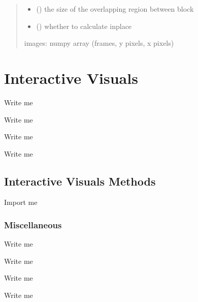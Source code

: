 \documentclass[letterpaper,10pt,english]{sphinxmanual}
\begin{document}
\begin{fulllineitems}
\begin{quote}
\begin{description}
\begin{itemize}
\item {} 
\sphinxAtStartPar
{} () \textendash{} the size of the overlapping region between block

\item {} 
\sphinxAtStartPar
{} () \textendash{} whether to calculate in\sphinxhyphen{}place

\end{itemize}

\sphinxAtStartPar
images: numpy array (frames, y pixels, x pixels)

\sphinxAtStartPar
{}

\end{description}\end{quote}

\end{fulllineitems}



\section{Interactive Visuals}
\label{\detokenize{Sub-Packages:interactive-visuals}}\label{\detokenize{Sub-Packages:interactive-visuals-module}}
\begin{DUlineblock}{0em}
\item[] Write me
\item[] Write me
\item[] Write me
\item[] Write me
\end{DUlineblock}


\subsection{Interactive Visuals Methods}
\label{\detokenize{Sub-Packages:interactive-visuals-methods}}
\begin{DUlineblock}{0em}
\item[] Import me
\end{DUlineblock}


\subsubsection{Miscellaneous}
\label{\detokenize{Sub-Packages:miscellaneous}}\label{\detokenize{Sub-Packages:miscellaneous-module}}
\begin{DUlineblock}{0em}
\item[] Write me
\item[] Write me
\item[] Write me
\item[] Write me
\end{DUlineblock}
\end{document}

